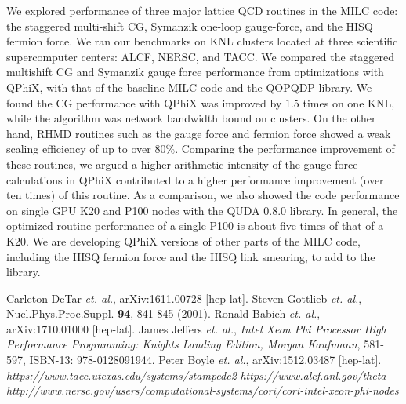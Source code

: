 \documentclass[epj]{webofc}
\begin{document}
We explored performance of three major lattice QCD routines in the MILC code: 
the staggered multi-shift CG, Symanzik one-loop gauge-force, and the HISQ fermion force. 
We ran our benchmarks on KNL clusters located at three scientific supercomputer centers: ALCF, NERSC, and TACC. 
We compared the staggered multishift CG and Symanzik gauge force performance from optimizations with QPhiX, 
with that of the baseline MILC code and the QOPQDP library. 
We found the CG performance with QPhiX was improved by $1.5$ times on one KNL, 
while the algorithm was network bandwidth bound on clusters. 
On the other hand, 
RHMD routines such as the gauge force and fermion force showed a weak scaling 
efficiency of up to over $80\%$. 
Comparing the performance improvement of these routines, 
we argued a higher arithmetic intensity of the gauge force calculations in QPhiX contributed to a higher performance improvement (over ten times) of this routine. 
As a comparison, we also showed the code performance on single GPU K20 and P100 nodes with the QUDA 0.8.0 library. 
In general, the optimized routine performance of a single P100 is 
about five times of that of a K20. %
We are developing QPhiX versions of other parts of the MILC code,
including the HISQ fermion force and the HISQ link smearing, to add to the library. 




\clearpage
%



\begin{thebibliography}{99}
 Carleton DeTar \textit{et. al.}, arXiv:1611.00728 [hep-lat]. 
 Steven Gottlieb \textit{et. al.}, Nucl.Phys.Proc.Suppl. \textbf{94}, 841-845 (2001). 
 Ronald Babich \textit{et. al.}, arXiv:1710.01000 [hep-lat]. 
 James Jeffers \textit{et. al.}, \textit{Intel Xeon Phi Processor High Performance Programming: Knights Landing Edition, Morgan Kaufmann}, 581-597, ISBN-13: 978-0128091944. 
 Peter Boyle \textit{et. al.}, arXiv:1512.03487 [hep-lat]. 
 \textit{https://www.tacc.utexas.edu/systems/stampede2}
 \textit{https://www.alcf.anl.gov/theta}
 \textit{http://www.nersc.gov/users/computational-systems/cori/cori-intel-xeon-phi-nodes}
\end{thebibliography}
\end{document}

